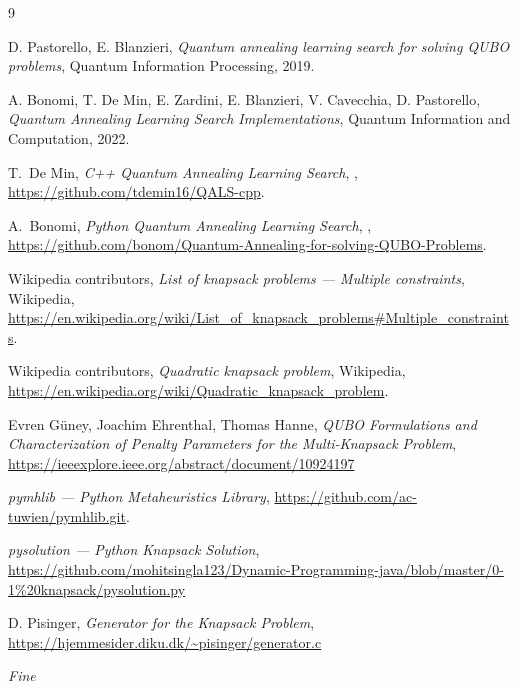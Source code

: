 \documentclass[12pt,a4paper,oneside]{report}
\begin{document}
\begin{thebibliography}{9}

D. Pastorello, E. Blanzieri,
\textit{Quantum annealing learning search for solving QUBO problems},
Quantum Information Processing, 2019.

A. Bonomi, T. De Min, E. Zardini, E. Blanzieri, V. Cavecchia, D. Pastorello,
\textit{Quantum Annealing Learning Search Implementations},
Quantum Information and Computation, 2022.


T.~De Min,
\newblock \emph{C++ Quantum Annealing Learning Search},
,
\newblock \url{https://github.com/tdemin16/QALS-cpp}.

A.~Bonomi,
\newblock \emph{Python Quantum Annealing Learning Search},
,
\newblock \url{https://github.com/bonom/Quantum-Annealing-for-solving-QUBO-Problems}.

Wikipedia contributors,
\newblock \emph{List of knapsack problems --- Multiple constraints},
\newblock Wikipedia,
\newblock \url{https://en.wikipedia.org/wiki/List_of_knapsack_problems#Multiple_constraints}.

Wikipedia contributors,
\newblock \emph{Quadratic knapsack problem},
\newblock Wikipedia,
\newblock \url{https://en.wikipedia.org/wiki/Quadratic_knapsack_problem}.

Evren G\"{u}ney, Joachim Ehrenthal, Thomas Hanne,
\newblock \emph{QUBO Formulations and Characterization of Penalty Parameters for the Multi-Knapsack Problem},
\newblock \url{https://ieeexplore.ieee.org/abstract/document/10924197}

\newblock \emph{pymhlib --- Python Metaheuristics Library},
\newblock \url{https://github.com/ac-tuwien/pymhlib.git}.

\newblock \emph{pysolution --- Python Knapsack Solution},
\newblock \url{https://github.com/mohitsingla123/Dynamic-Programming-java/blob/master/0-1%20knapsack/pysolution.py}

D. Pisinger,
\newblock \emph{Generator for the Knapsack Problem},
\newblock \url{https://hjemmesider.diku.dk/~pisinger/generator.c}

\end{thebibliography}

\clearpage
\thispagestyle{empty}
\vspace*{\fill}
\begin{center}
    \textit{Fine}
\end{center}
\vspace*{\fill}
\end{document}
